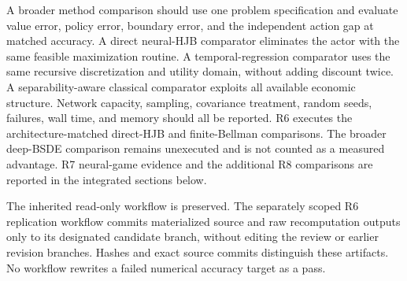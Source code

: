 \documentclass[ecta,draft]{econsocart}
\begin{document}
A broader method comparison should use one problem specification and evaluate value error, policy error, boundary error, and the independent action gap at matched accuracy. A direct neural-HJB comparator eliminates the actor with the same feasible maximization routine. A temporal-regression comparator uses the same recursive discretization and utility domain, without adding discount twice. A separability-aware classical comparator exploits all available economic structure. Network capacity, sampling, covariance treatment, random seeds, failures, wall time, and memory should all be reported. R6 executes the architecture-matched direct-HJB and finite-Bellman comparisons. The broader deep-BSDE comparison remains unexecuted and is not counted as a measured advantage. R7 neural-game evidence and the additional R8 comparisons are reported in the integrated sections below.

The inherited read-only workflow is preserved. The separately scoped R6 replication workflow commits materialized source and raw recomputation outputs only to its designated candidate branch, without editing the review or earlier revision branches. Hashes and exact source commits distinguish these artifacts. No workflow rewrites a failed numerical accuracy target as a pass.



\end{document}
